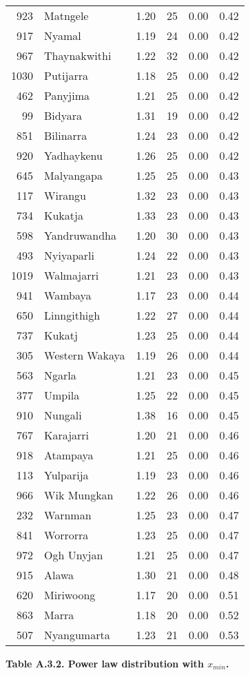 \begin{longtable}[]{@{}rlrrrr@{}}
923 & Matngele & 1.20 & 25 & 0.00 & 0.42\tabularnewline
917 & Nyamal & 1.19 & 24 & 0.00 & 0.42\tabularnewline
967 & Thaynakwithi & 1.22 & 32 & 0.00 & 0.42\tabularnewline
1030 & Putijarra & 1.18 & 25 & 0.00 & 0.42\tabularnewline
462 & Panyjima & 1.21 & 25 & 0.00 & 0.42\tabularnewline
99 & Bidyara & 1.31 & 19 & 0.00 & 0.42\tabularnewline
851 & Bilinarra & 1.24 & 23 & 0.00 & 0.42\tabularnewline
920 & Yadhaykenu & 1.26 & 25 & 0.00 & 0.42\tabularnewline
645 & Malyangapa & 1.25 & 25 & 0.00 & 0.43\tabularnewline
117 & Wirangu & 1.32 & 23 & 0.00 & 0.43\tabularnewline
734 & Kukatja & 1.33 & 23 & 0.00 & 0.43\tabularnewline
598 & Yandruwandha & 1.20 & 30 & 0.00 & 0.43\tabularnewline
493 & Nyiyaparli & 1.24 & 22 & 0.00 & 0.43\tabularnewline
1019 & Walmajarri & 1.21 & 23 & 0.00 & 0.43\tabularnewline
941 & Wambaya & 1.17 & 23 & 0.00 & 0.44\tabularnewline
650 & Linngithigh & 1.22 & 27 & 0.00 & 0.44\tabularnewline
737 & Kukatj & 1.23 & 25 & 0.00 & 0.44\tabularnewline
305 & Western Wakaya & 1.19 & 26 & 0.00 & 0.44\tabularnewline
563 & Ngarla & 1.21 & 23 & 0.00 & 0.45\tabularnewline
377 & Umpila & 1.25 & 22 & 0.00 & 0.45\tabularnewline
910 & Nungali & 1.38 & 16 & 0.00 & 0.45\tabularnewline
767 & Karajarri & 1.20 & 21 & 0.00 & 0.46\tabularnewline
918 & Atampaya & 1.21 & 25 & 0.00 & 0.46\tabularnewline
113 & Yulparija & 1.19 & 23 & 0.00 & 0.46\tabularnewline
966 & Wik Mungkan & 1.22 & 26 & 0.00 & 0.46\tabularnewline
232 & Warnman & 1.25 & 23 & 0.00 & 0.47\tabularnewline
841 & Worrorra & 1.23 & 25 & 0.00 & 0.47\tabularnewline
972 & Ogh Unyjan & 1.21 & 25 & 0.00 & 0.47\tabularnewline
915 & Alawa & 1.30 & 21 & 0.00 & 0.48\tabularnewline
620 & Miriwoong & 1.17 & 20 & 0.00 & 0.51\tabularnewline
863 & Marra & 1.18 & 20 & 0.00 & 0.52\tabularnewline
507 & Nyangumarta & 1.23 & 21 & 0.00 & 0.53\tabularnewline
\bottomrule
\end{longtable}

\newpage

\textbf{Table A.3.2. Power law distribution with \(x_{min}\).}

